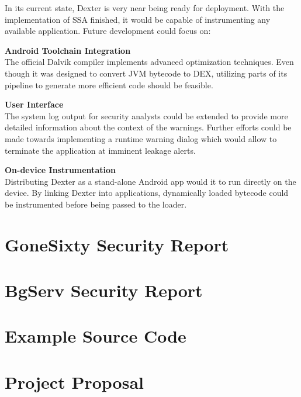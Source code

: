 \documentclass[12pt,twoside,notitlepage]{report}
\begin{document}
In its current state, Dexter is very near being ready for deployment. With the implementation of SSA finished, it would be capable of instrumenting any available application. Future development could focus on:
\begin{description}
\item \textbf{Android Toolchain Integration} \\
The official Dalvik compiler implements advanced optimization techniques. Even though it was designed to convert JVM bytecode to DEX, utilizing parts of its pipeline to generate more efficient code should be feasible.

\item \textbf{User Interface} \\
The system log output for security analysts could be extended to provide more detailed information about the context of the warnings. Further efforts could be made towards implementing a runtime warning dialog which would allow to terminate the application at imminent leakage alerts.

\item \textbf{On-device Instrumentation} \\
Distributing Dexter as a stand-alone Android app would it to run directly on the device. By linking Dexter into applications, dynamically loaded bytecode could be instrumented before being passed to the loader.

\end{description}

\cleardoublepage



\cleardoublepage

\appendix

\chapter{GoneSixty Security Report}
\label{chapter:Report_Gone60}

\cleardoublepage

\chapter{BgServ Security Report}
\label{chapter:Report_BgServ}

\cleardoublepage

\chapter{Example Source Code}

\cleardoublepage

\chapter{Project Proposal}


\end{document}
